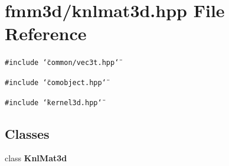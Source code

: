 \section{fmm3d/knlmat3d.hpp File Reference}
\label{knlmat3d_8hpp}


{\tt \#include \char`\"{}common/vec3t.hpp\char`\"{}}\par
{\tt \#include \char`\"{}comobject.hpp\char`\"{}}\par
{\tt \#include \char`\"{}kernel3d.hpp\char`\"{}}\par
\subsection*{Classes}
\begin{CompactItemize}
\item 
class {\bf Knl\-Mat3d}
\end{CompactItemize}

